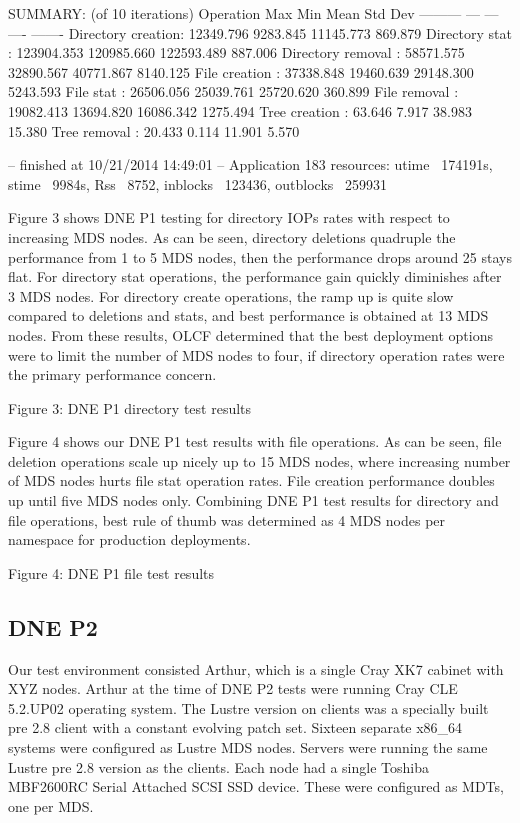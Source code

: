\documentclass[conference,compsoc]{IEEEtran}
\begin{document}
SUMMARY: (of 10 iterations)
   Operation                  Max        Min       Mean    Std Dev
   ---------                  ---        ---       ----    -------
   Directory creation:  12349.796   9283.845  11145.773    869.879
   Directory stat    : 123904.353 120985.660 122593.489    887.006
   Directory removal :  58571.575  32890.567  40771.867   8140.125
   File creation     :  37338.848  19460.639  29148.300   5243.593
   File stat         :  26506.056  25039.761  25720.620    360.899
   File removal      :  19082.413  13694.820  16086.342   1275.494
   Tree creation     :     63.646      7.917     38.983     15.380
   Tree removal      :     20.433      0.114     11.901      5.570

-- finished at 10/21/2014 14:49:01 --
Application 183 resources: utime ~174191s, stime ~9984s, Rss ~8752, inblocks ~123436, outblocks ~259931

Figure 3 shows DNE P1 testing for directory IOPs rates with respect to
increasing MDS nodes. As can be seen, directory deletions quadruple the
performance from 1 to 5 MDS nodes, then the performance drops around 25%
stays flat. For directory stat operations, the performance gain quickly
diminishes after 3 MDS nodes. For directory create operations, the ramp up is
quite slow compared to deletions and stats, and best performance is obtained at
13 MDS nodes. From these results, OLCF determined that the best deployment
options were to limit the number of MDS nodes to four, if directory operation
rates were the primary performance concern.
 
Figure 3: DNE P1 directory test results

Figure 4 shows our DNE P1 test results with file operations. As can be seen,
file deletion operations scale up nicely up to 15 MDS nodes, where increasing
number of MDS nodes hurts file stat operation rates. File creation performance
doubles up until five MDS nodes only.  Combining DNE P1 test results for
directory and file operations, best rule of thumb was determined as 4 MDS nodes
per namespace for production deployments.
 
Figure 4: DNE P1 file test results


\subsection{DNE P2}

Our test environment consisted Arthur, which is a single Cray XK7 cabinet with
XYZ nodes. Arthur at the time of DNE P2 tests were running Cray CLE 5.2.UP02
operating system. The Lustre version on clients was a specially built pre 2.8
client with a constant evolving patch set. Sixteen separate x86_64 systems were
configured as Lustre MDS nodes. Servers were running the same Lustre pre 2.8
version as the clients. Each node had a single Toshiba MBF2600RC Serial
Attached SCSI SSD device. These were configured as MDTs, one per MDS. 
\end{document}
